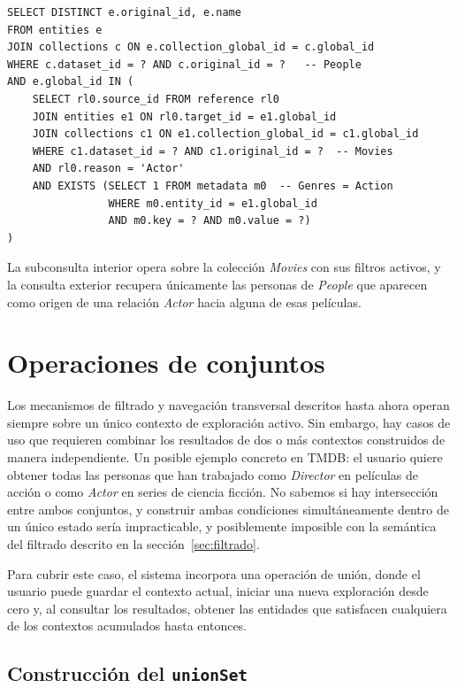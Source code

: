 \begin{lstlisting}[style=sqlStyle, caption={[\textit{Query} SQL de la navegación transversal]\textit{Query} SQL resultante de la navegación transversal}, label=lst:queryResultante]
SELECT DISTINCT e.original_id, e.name
FROM entities e
JOIN collections c ON e.collection_global_id = c.global_id
WHERE c.dataset_id = ? AND c.original_id = ?   -- People
AND e.global_id IN (
    SELECT rl0.source_id FROM reference rl0
    JOIN entities e1 ON rl0.target_id = e1.global_id
    JOIN collections c1 ON e1.collection_global_id = c1.global_id
    WHERE c1.dataset_id = ? AND c1.original_id = ?  -- Movies
    AND rl0.reason = 'Actor'
    AND EXISTS (SELECT 1 FROM metadata m0  -- Genres = Action
                WHERE m0.entity_id = e1.global_id
                AND m0.key = ? AND m0.value = ?)
)
\end{lstlisting}

La subconsulta interior opera sobre la colección \textit{Movies} con sus filtros activos,
y la consulta exterior recupera únicamente las personas de \textit{People} que aparecen
como origen de una relación \textit{Actor} hacia alguna de esas películas.

\section{Operaciones de conjuntos}
\label{sec:operaciones_conjuntos}

Los mecanismos de filtrado y navegación transversal descritos hasta ahora operan siempre
sobre un único contexto de exploración activo. Sin embargo, hay casos de uso que requieren
combinar los resultados de dos o más contextos construidos de manera independiente. Un posible 
ejemplo concreto en TMDB: el usuario quiere obtener todas las personas que han trabajado como
\textit{Director} en películas de acción o como \textit{Actor} en series de
ciencia ficción. No sabemos si hay intersección entre ambos conjuntos, y construir ambas
condiciones simultáneamente dentro de un único estado sería impracticable, y  posiblemente imposible con 
la semántica del filtrado descrito en la sección~\ref{sec:filtrado}.

Para cubrir este caso, el sistema incorpora una operación de unión, donde el usuario puede
guardar el contexto actual, iniciar una nueva exploración desde cero y, al consultar
los resultados, obtener las entidades que satisfacen cualquiera de los contextos
acumulados hasta entonces.

    \subsection{Construcción del \texttt{unionSet}}

